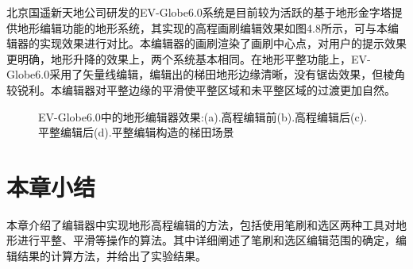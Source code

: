 北京国遥新天地公司研发的EV-Globe6.0系统\supercite{ev-globe}是目前较为活跃的基于地形金字塔提供地形编辑功能的地形系统，其实现的高程画刷编辑效果如图4.8所示，可与本编辑器的实现效果进行对比。本编辑器的画刷渲染了画刷中心点，对用户的提示效果更明确，地形升降的效果上，两个系统基本相同。在地形平整功能上，EV-Globe6.0采用了矢量线编辑，编辑出的梯田地形边缘清晰，没有锯齿效果，但棱角较锐利。本编辑器对平整边缘的平滑使平整区域和未平整区域的过渡更加自然。
\begin{figure}[h]
\centering
{}

\caption{EV-Globe6.0中的地形编辑器效果\supercite{ev-globe}:(a).高程编辑前(b).高程编辑后(c).平整编辑后(d).平整编辑构造的梯田场景}
\end{figure}
\section{本章小结}
本章介绍了编辑器中实现地形高程编辑的方法，包括使用笔刷和选区两种工具对地形进行平整、平滑等操作的算法。其中详细阐述了笔刷和选区编辑范围的确定，编辑结果的计算方法，并给出了实验结果。\par

